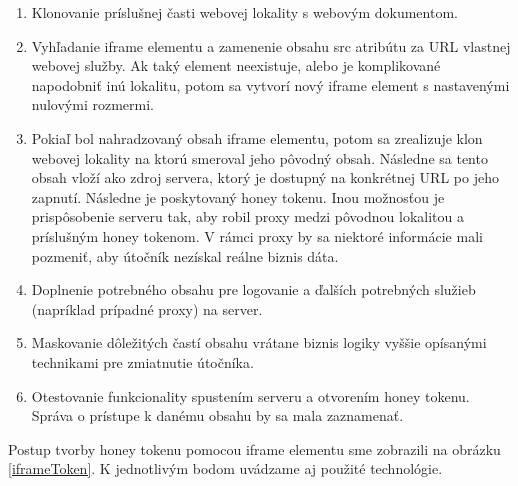 \documentclass[conference, 11pt,slovak,a4paper,twoside]{IEEEtran}
\begin{document}
\begin{enumerate}
	\item Klonovanie príslušnej časti webovej lokality s webovým dokumentom.

	\item Vyhľadanie iframe elementu a zamenenie obsahu src atribútu za URL vlastnej webovej služby. Ak taký element neexistuje, alebo je komplikované napodobniť inú lokalitu, potom sa vytvorí nový iframe element s nastavenými nulovými rozmermi.
	
	\item Pokiaľ bol nahradzovaný obsah iframe elementu, potom sa zrealizuje klon webovej lokality na ktorú smeroval jeho pôvodný obsah. Následne sa tento obsah vloží ako zdroj servera, ktorý je dostupný na konkrétnej URL po jeho zapnutí. Následne je poskytovaný honey tokenu. Inou možnosťou je prispôsobenie serveru tak, aby robil proxy medzi pôvodnou lokalitou a príslušným honey tokenom. V rámci proxy by sa niektoré informácie mali pozmeniť, aby útočník nezískal reálne biznis dáta.
	
	\item Doplnenie potrebného obsahu pre logovanie a ďalších potrebných služieb (napríklad prípadné proxy) na server.
	
	\item Maskovanie dôležitých častí obsahu vrátane biznis logiky vyššie opísanými technikami pre zmiatnutie útočníka.
	
	\item Otestovanie funkcionality spustením serveru a otvorením honey tokenu. Správa o prístupe k danému obsahu by sa mala zaznamenať.
\end{enumerate}


Postup tvorby honey tokenu pomocou iframe elementu sme zobrazili na obrázku \ref{iframeToken}. K jednotlivým bodom uvádzame aj použité technológie.
\end{document}
